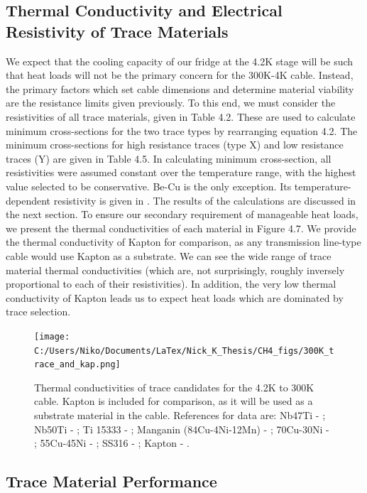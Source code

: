 \documentclass{report}
\begin{document}
\subsection{Thermal Conductivity and Electrical Resistivity of Trace Materials}

We expect that the cooling capacity of our fridge at the 4.2K stage will be such that heat loads will not be the primary concern for the 300K-4K cable. Instead, the primary factors which set cable dimensions and determine material viability are the resistance limits given previously. To this end, we must consider the resistivities of all trace materials, given in Table 4.2. These are used to calculate minimum cross-sections for the two trace types by rearranging equation 4.2. The minimum cross-sections for high resistance traces (type X) and low resistance traces (Y) are given in Table 4.5. In calculating minimum cross-section, all resistivities were assumed constant over the temperature range, with the highest value selected to be conservative. Be-Cu is the only exception. Its temperature-dependent resistivity is given in \cite{Sciver1986}. The results of the calculations are discussed in the next section.
To ensure our secondary requirement of manageable heat loads, we present the thermal conductivities of each material in  Figure 4.7. We provide the thermal conductivity of Kapton for comparison, as any transmission line-type cable would use Kapton as a substrate. We can see the wide range of trace material thermal conductivities (which are, not surprisingly, roughly inversely proportional to each of their resistivities). In addition, the very low thermal conductivity of Kapton leads us to expect heat loads which are dominated by trace selection.

\begin{figure}[ht]
\centering
\texttt{[image: C:/Users/Niko/Documents/LaTex/Nick\_K\_Thesis/CH4\_figs/300K\_trace\_and\_kap.png]}
\caption{Thermal conductivities of trace candidates for the 4.2K to 300K cable. Kapton is included for comparison, as it will be used as a substrate material in the cable. References for data are: Nb47Ti - \cite{Blake} ; Nb50Ti - \cite{Flachbart1978} ; Ti 15333 - \cite{Canavan2006} ; Manganin (84Cu-4Ni-12Mn) - \cite{tou} ; 70Cu-30Ni - \cite{Blake} ; 55Cu-45Ni - \cite{tou} ; SS316 - \cite{ss316_nist} ; Kapton - \cite{Rule1996}.}
\end{figure}

\subsection{Trace Material Performance}
\end{document}
